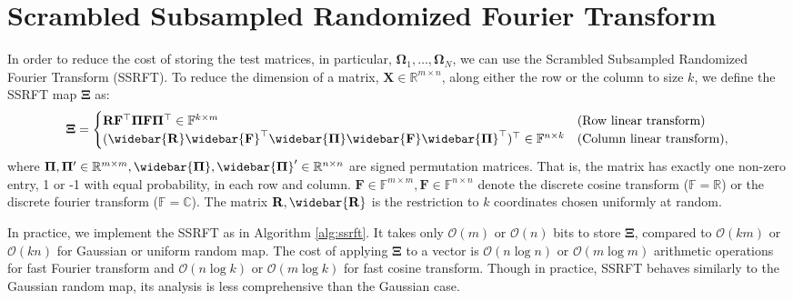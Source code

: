 \section{Scrambled Subsampled Randomized Fourier Transform} \label{appendix: ssrft}

In order to reduce the cost of storing the test matrices, in particular, $\mathbf{\Omega}_1, \dots, \mathbf{\Omega}_N$, we can use the Scrambled Subsampled Randomized Fourier Transform (SSRFT). To reduce the dimension of a matrix, $\mathbf{X} \in \mathbb{R}^{m \times n}$, along either the row or the column to size $k$, we define the SSRFT map $\mathbf{\Xi}$ as: 
\begin{equation}
\mathbf{\Xi} = \begin{cases}\mathbf{R}\mathbf{F}^\top \mathbf{\Pi}\mathbf{F}\mathbf{\Pi}^\top \in \mathbb{F}^{k \times m} & \text{(Row linear transform)}\\ 
(\widebar{\mathbf{R}}\widebar{\mathbf{F}}^\top\widebar{\mathbf{\Pi}}\widebar{\mathbf{F}}\widebar{\mathbf{\Pi}}^\top)^\top \in \mathbb{F}^{n \times k} & \text{(Column linear transform)} , \nonumber
\end{cases}
\end{equation}
where $\mathbf{\Pi}, \mathbf{\Pi}' \in \mathbb{R}^{m \times m}, \widebar{\mathbf{\Pi}}, \widebar{\mathbf{\Pi}}' \in \mathbb{R}^{n \times n}$ are signed permutation matrices. That is, the matrix has exactly one non-zero entry, 1 or -1 with equal probability, in each row and column. $\mathbf{F} \in \mathbb{F}^{m \times m}, \mathbf{F} \in \mathbb{F}^{n \times n}$ denote the discrete cosine transform ($\mathbb{F} = \mathbb{R}$) or the discrete fourier transform ($\mathbb{F} = \mathbb{C}$). The matrix $\mathbf{R}, \widebar{\mathbf{R}}$ is the restriction to $k$ coordinates chosen uniformly at random. 

In practice, we implement the SSRFT as in  Algorithm \ref{alg:ssrft}. It takes only $\mathcal{O}(m)$ or $\mathcal{O}(n)$ bits to store $\mathbf{\Xi}$, compared to $\mathcal{O}(km)$ or $\mathcal{O}(kn)$ for Gaussian or uniform random map. The cost of applying $\mathbf{\Xi}$ to a vector is $\mathcal{O}(n\log n)$ or $\mathcal{O}(m \log m)$ arithmetic operations for fast Fourier transform and $\mathcal{O}(n\log  k)$ or $\mathcal{O}(m \log k)$ for fast cosine transform. Though in practice, SSRFT behaves similarly to the Gaussian random map, its analysis is less comprehensive \cite{boutsidis2013improved,tropp2011improved, ailon2009fast} than the Gaussian case. 

